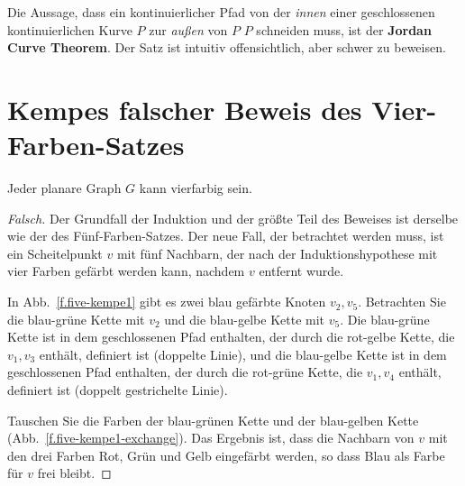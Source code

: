 \begin{advanced}
Die Aussage, dass ein kontinuierlicher Pfad von der \emph{innen} einer geschlossenen kontinuierlichen Kurve $P$ zur \emph{außen} von $P$ $P$ schneiden muss, ist der \textbf{Jordan Curve Theorem}. Der Satz ist intuitiv offensichtlich, aber schwer zu beweisen.
\end{advanced}

\section{Kempes falscher Beweis des Vier-Farben-Satzes}\label{s.kempe}

\begin{theorem}\label{thm.fourcolor}
Jeder planare Graph $G$ kann vierfarbig sein.
\end{theorem}

\begin{proof}[Falsch] Der Grundfall der Induktion und der größte Teil des Beweises ist derselbe wie der des Fünf-Farben-Satzes. Der neue Fall, der betrachtet werden muss, ist ein Scheitelpunkt $v$ mit fünf Nachbarn, der nach der Induktionshypothese mit vier Farben gefärbt werden kann, nachdem $v$ entfernt wurde.

In Abb.~\ref{f.five-kempe1} gibt es zwei blau gefärbte Knoten $v_2,v_5$. Betrachten Sie die blau-grüne Kette mit $v_2$ und die blau-gelbe Kette mit $v_5$. Die blau-grüne Kette ist in dem geschlossenen Pfad enthalten, der durch die rot-gelbe Kette, die $v_1,v_3$ enthält, definiert ist (doppelte Linie), und die blau-gelbe Kette ist in dem geschlossenen Pfad enthalten, der durch die rot-grüne Kette, die $v_1,v_4$ enthält, definiert ist (doppelt gestrichelte Linie).

Tauschen Sie die Farben der blau-grünen Kette und der blau-gelben Kette (Abb.~\ref{f.five-kempe1-exchange}). Das Ergebnis ist, dass die Nachbarn von $v$ mit den drei Farben Rot, Grün und Gelb eingefärbt werden, so dass Blau als Farbe für $v$ frei bleibt.
\end{proof}

